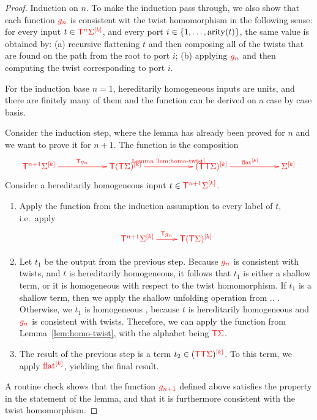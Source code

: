 \begin{proof}
    Induction on $n$. To make the induction pass through, we also show that each function $\ranked{g_n}$ is consistent wit the  twist homomorphism in the following sense: for every input $t \in \tmonadn n \mati k \rSigma$, and every port $i \in \set{1,\ldots,\arity t}$, the same value is obtained by: (a) recursive flattening $t$ and then composing all of the twists that are found on the path from the root to port $i$; (b) applying $\ranked{g_n}$ and then computing the twist corresponding to port $i$. 
    
    For the induction base $n=1$, hereditarily homogeneous inputs are units, and there are finitely many of them and the function can be derived on a case by case basis. 
    
    Consider the induction step, where the lemma has already been proved for $n$ and we want to prove it for $n+1$. The function is the composition
    \begin{align*}
        \ranked{
            \xymatrix@C=2cm{
                \tmonadn {n+1} \mati k \Sigma \ar[r]^{\tmonad g_n} & \tmonad \mati k{(\tmonad \Sigma)} \ar[r]^{\text{Lemma~\ref{lem:homo-twist}}}&  \mati k  {(\tmonad \tmonad \rSigma)} \ar[r]^{\mati k \flatt} & \mati k \rSigma
            }
        }
    \end{align*}
    Consider a  hereditarily homogeneous input $t   \in \ranked{\tmonadn{n+1} \mati k \Sigma}$. 
    \begin{enumerate}
            \item Apply the function from the induction assumption to every label of $t$, i.e.~apply 
        \begin{align*}
        \ranked{
            \xymatrix{
                \tmonadn {n+1} \mati k \Sigma \ar[r]^{\tmonad g_n} & \tmonad \mati k{(\tmonad \Sigma)}
            }
        }
        \end{align*}
        \item Let $t_1$ be the output from the previous step. Because $\ranked {g_n}$ is consistent with twists, and $t$ is hereditarily homogeneous, it follows that $t_1$  is either a shallow term, or it is homogeneous with respect to the twist homomorphism.  If $t_1$ is a shallow term, then we apply the shallow unfolding operation from .. . Otherwise, we $t_1$ is homogeneous
        , because $t$ is hereditarily homogeneous and $\ranked{g_n}$ is consistent with twists. Therefore, we can apply the function
        from Lemma~\ref{lem:homo-twist}, with the alphabet being $\tmonad \rSigma$. 
        \item The result of the previous step is a term $t_2 \in \mati k {(\tmonad \tmonad \rSigma)}$. To this term, we apply $\mati k \flatt$, yielding the final result.
    \end{enumerate}
    A routine check shows that the function $\ranked{g_{n+1}}$ defined above satisfies the property in the statement of the lemma, and that it is furthermore consistent with the twist homomorphism.     
\end{proof}